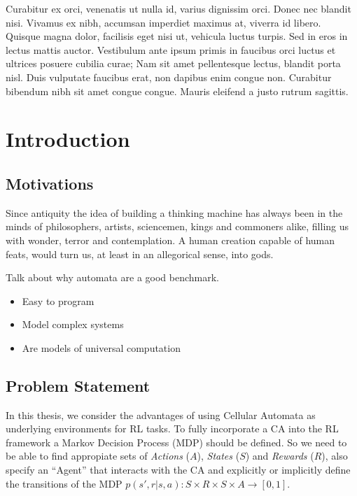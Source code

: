 \documentclass[
  openany]{book}
\providecommand{\tightlist}{%
  \setlength{\itemsep}{0pt}\setlength{\parskip}{0pt}}
\begin{document}
Curabitur ex orci, venenatis ut nulla id, varius dignissim orci. Donec nec blandit nisi. Vivamus ex nibh, accumsan imperdiet maximus at, viverra id libero. Quisque magna dolor, facilisis eget nisi ut, vehicula luctus turpis. Sed in eros in lectus mattis auctor. Vestibulum ante ipsum primis in faucibus orci luctus et ultrices posuere cubilia curae; Nam sit amet pellentesque lectus, blandit porta nisl. Duis vulputate faucibus erat, non dapibus enim congue non. Curabitur bibendum nibh sit amet congue congue. Mauris eleifend a justo rutrum sagittis.

\newpage

\hypertarget{introduction}{%
\chapter{Introduction}\label{introduction}}

\hypertarget{motivations}{%
\section{Motivations}\label{motivations}}

Since antiquity the idea of building a thinking machine has always been in the minds of philosophers, artists, sciencemen, kings and commoners alike, filling us with wonder, terror and contemplation. A human creation capable of human feats, would turn us, at least in an allegorical sense, into gods.

Talk about why automata are a good benchmark.

\begin{itemize}
\tightlist
\item
  Easy to program
\item
  Model complex systems
\item
  Are models of universal computation
\end{itemize}

\hypertarget{problem-statement}{%
\section{Problem Statement}\label{problem-statement}}

In this thesis, we consider the advantages of using Cellular Automata as underlying environments for RL tasks. To fully incorporate a CA into the RL framework a Markov Decision Process (MDP) should be defined. So we need to be able to find appropiate sets of \emph{Actions} (\(A\)), \emph{States} (\(S\)) and \emph{Rewards} (\(R\)), also specify an ``Agent'' that interacts with the CA and explicitly or implicitly define the transitions of the MDP \(p(s',r|s,a): S \times R \times S \times A \rightarrow [0,1]\).
\end{document}
